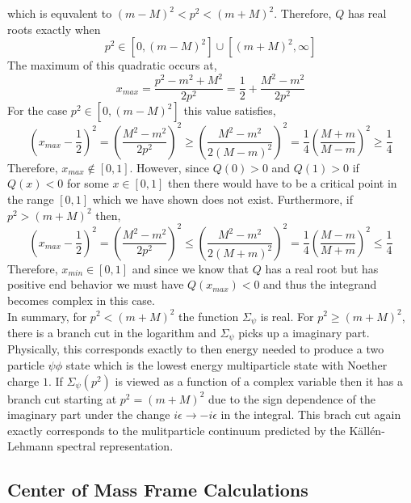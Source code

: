 \documentclass{article}
\begin{document}
which is equvalent to $(m - M)^2 < p^2 < (m + M)^2$. Therefore, $Q$ has real roots exactly when\[p^2 \in [0, (m - M)^2] \cup [(m+M)^2, \infty]\]
The maximum of this quadratic occurs at,
\[x_{max} = \frac{p^2 - m^2 + M^2}{2 p^2}  = \frac{1}{2} + \frac{M^2 - m^2}{2 p^2}\]
For the case $p^2 \in [0, (m - M)^2]$ this value satisfies,
\[ \left(x_{max} - \frac{1}{2} \right)^2 = \left( \frac{M^2 - m^2}{2 p^2} \right)^2 \ge \left( \frac{M^2 - m^2}{2 (M - m)^2} \right)^2 = \frac{1}{4} \left( \frac{M + m}{M - m} \right)^2  \ge \frac{1}{4}\]
Therefore, $x_{max} \notin [0, 1]$. However, since $Q(0) > 0$ and $Q(1) > 0$ if $Q(x) < 0$ for some $x \in [0, 1]$ then there would have to be a critical point in the range $[0, 1]$ which we have shown does not exist. Furthermore, if $p^2 > (m + M)^2$ then, 
\[ \left(x_{max} - \frac{1}{2} \right)^2 = \left( \frac{M^2 - m^2}{2 p^2} \right)^2 \le \left( \frac{M^2 - m^2}{2 (M + m)^2} \right)^2 = \frac{1}{4} \left( \frac{M - m}{M + m} \right)^2  \le \frac{1}{4}\]
Therefore, $x_{min} \in [0, 1]$ and since we know that $Q$ has a real root but has positive end behavior we must have $Q(x_{max}) < 0$ and thus the integrand becomes complex in this case. \bigskip\\
In summary, for $p^2 < (m + M)^2$ the function $\Sigma_{\psi}$ is real. For $p^2 \ge (m + M)^2$, there is a branch cut in the logarithm and $\Sigma_\psi$ picks up a imaginary part. Physically, this corresponds exactly to then energy needed to produce a two particle $\psi \phi$ state which is the lowest energy multiparticle state with Noether charge $1$. If $\Sigma_\psi(p^2)$ is viewed as a function of a complex variable then it has a branch cut starting at $p^2 = (m + M)^2$ due to the sign dependence of the imaginary part under the change $i \epsilon \to - i \epsilon$ in the integral. This brach cut again exactly corresponds to the mulitparticle continuum predicted by the K{\"a}ll{\'e}n-Lehmann spectral representation.

\subsection{Center of Mass Frame Calculations}
\end{document}

